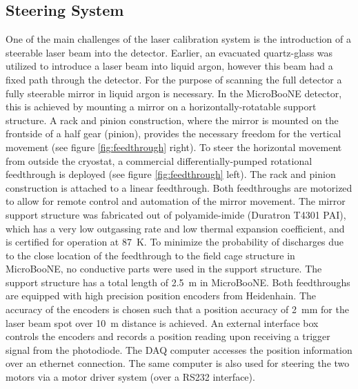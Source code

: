 \subsection{Steering System}
One of the main challenges of the laser calibration system is the introduction of a steerable laser beam into the detector. Earlier, an evacuated quartz-glass \cite{BernLaser} was utilized to introduce a laser beam into liquid argon, however this beam had a fixed path through the detector. For the purpose of scanning the full detector a fully steerable mirror in liquid argon is necessary. In the MicroBooNE detector, this is achieved by mounting a mirror on a horizontally-rotatable support structure. A rack and pinion construction, where the mirror is mounted on the frontside of a half gear (pinion), provides the necessary freedom for the vertical movement (see figure \ref{fig:feedthrough} right). To steer the horizontal movement from outside the cryostat, a commercial differentially-pumped rotational feedthrough is deployed (see figure \ref{fig:feedthrough} left). The rack and pinion construction is attached to a linear feedthrough. Both feedthroughs are motorized to allow for remote control and automation of the mirror movement. The mirror support structure was fabricated out of polyamide-imide (Duratron T4301 PAI), which has a very low outgassing rate and low thermal expansion coefficient, and is certified for operation at 87~K. To minimize the probability of discharges due to the close location of the feedthrough to the field cage structure in MicroBooNE, no conductive parts were used in the support structure. The support structure has a total length of 2.5~m in MicroBooNE.
Both feedthroughs are equipped with high precision position encoders from Heidenhain. The accuracy of the encoders is chosen such that a position accuracy of 2~mm for the laser beam spot over 10~m distance is achieved.  An external interface box controls the encoders and records a position reading upon receiving a trigger signal from the photodiode. The DAQ computer accesses the position information over an ethernet connection. The same computer is also used for steering the two motors via a motor driver system (over a RS232 interface).

